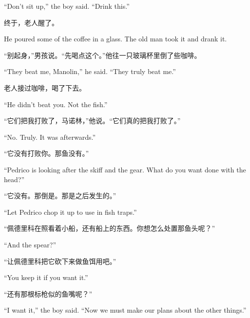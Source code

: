 \begin{paracol}{2}
\switchcolumn*

``Don't sit up,'' the boy said. ``Drink this.''

\switchcolumn

终于，老人醒了。

\switchcolumn*

He poured some of the coffee in a glass. The old man took it and drank it.

\switchcolumn

“别起身，”男孩说。“先喝点这个。”他往一只玻璃杯里倒了些咖啡。

\switchcolumn*

``They beat me, Manolin,'' he said. ``They truly beat me.''

\switchcolumn

老人接过咖啡，喝了下去。

\switchcolumn*

``He didn't beat you. Not the fish.''

\switchcolumn

“它们把我打败了，马诺林，”他说。“它们真的把我打败了。”

\switchcolumn*

``No. Truly. It was afterwards.''

\switchcolumn

“它没有打败你。那鱼没有。”

\switchcolumn*

``Pedrico is looking after the skiff and the gear. What do you want done with the head?''

\switchcolumn

“它没有。那倒是。那是之后发生的。”

\switchcolumn*

``Let Pedrico chop it up to use in fish traps.''

\switchcolumn

“佩德里科在照看着小船，还有船上的东西。你想怎么处置那鱼头呢？”

\switchcolumn*

``And the spear?''

\switchcolumn

“让佩德里科把它砍下来做鱼饵用吧。”

\switchcolumn*

``You keep it if you want it.''

\switchcolumn

“还有那根标枪似的鱼嘴呢？”

\switchcolumn*

``I want it,'' the boy said. ``Now we must make our plans about the other things.''


\end{paracol}
